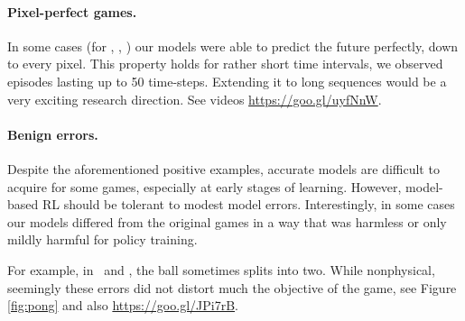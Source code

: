 
\paragraph{Pixel-perfect games.} In some cases (for \pong, \freeway, \breakout) our models were able to predict the future perfectly, down to every pixel. This property holds for rather short time intervals, we observed episodes lasting up to 50 time-steps. Extending it to long sequences would be a very exciting research direction. See videos \url{https://goo.gl/uyfNnW}.

\paragraph{Benign errors.} Despite the aforementioned positive examples, accurate models are difficult to acquire for some games, especially at early stages of learning. However, model-based RL should be tolerant to modest model errors. Interestingly, in some cases our models differed from the original games in a way that was harmless or only mildly harmful for policy training.

For example, in \bowling\, and \pong, the ball sometimes splits into two. While nonphysical, seemingly these errors did not distort much the objective of the game, see Figure \ref{fig:pong} and also \url{https://goo.gl/JPi7rB}.

